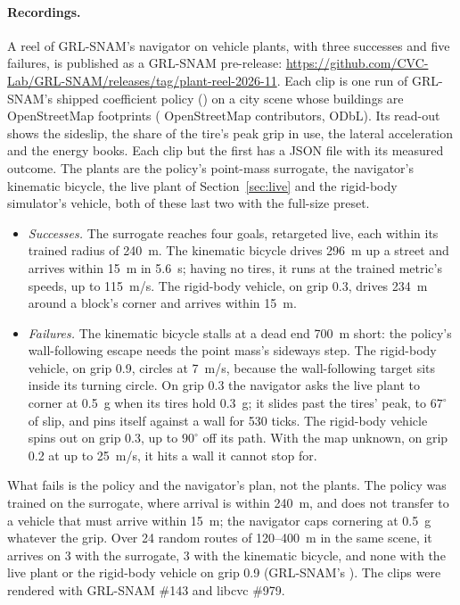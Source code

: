 \documentclass[11pt]{article}
\theoremstyle{remark}
\begin{document}
\paragraph{Recordings.} A reel of GRL-SNAM's navigator on vehicle plants, with three successes and
five failures, is published as a GRL-SNAM pre-release:
\url{https://github.com/CVC-Lab/GRL-SNAM/releases/tag/plant-reel-2026-11}. Each clip is one
 run of GRL-SNAM's shipped coefficient policy () on a
city scene whose buildings are OpenStreetMap footprints (\textcopyright{} OpenStreetMap
contributors, ODbL). Its read-out shows the sideslip, the share of the tire's peak grip in use,
the lateral acceleration and the energy books. Each clip but the first has a JSON file with its
measured outcome. The plants are the policy's point-mass surrogate, the navigator's kinematic
bicycle, the live plant of Section~\ref{sec:live} and the rigid-body simulator's vehicle, both of
these last two with the full-size preset.
\begin{itemize}
  \item \emph{Successes.} The surrogate reaches four goals, retargeted live, each within its
        trained radius of 240~m. The kinematic bicycle drives 296~m up a street and arrives within
        15~m in 5.6~s; having no tires, it runs at the trained metric's speeds, up to 115~m/s.
        The rigid-body vehicle, on grip 0.3, drives 234~m around a block's corner and arrives
        within 15~m.
  \item \emph{Failures.} The kinematic bicycle stalls at a dead end 700~m short: the policy's
        wall-following escape needs the point mass's sideways step. The rigid-body vehicle, on
        grip 0.9, circles at 7~m/s, because the wall-following target sits inside its turning
        circle. On grip 0.3 the navigator asks the live plant to corner at 0.5~g when its tires
        hold 0.3~g; it slides past the tires' peak, to $67^\circ$ of slip, and pins itself against
        a wall for 530 ticks. The rigid-body vehicle spins out on grip 0.3, up to $90^\circ$ off
        its path. With the map unknown, on grip 0.2 at up to 25~m/s, it hits a wall it cannot
        stop for.
\end{itemize}
What fails is the policy and the navigator's plan, not the plants. The policy was trained on the
surrogate, where arrival is within 240~m, and does not transfer to a vehicle that must arrive
within 15~m; the navigator caps cornering at 0.5~g whatever the grip. Over 24 random routes of
120--400~m in the same scene, it arrives on 3 with the surrogate, 3 with the kinematic bicycle,
and none with the live plant or the rigid-body vehicle on grip 0.9 (GRL-SNAM's
). The clips were rendered with GRL-SNAM \#143 and libcvc \#979.
\end{document}
